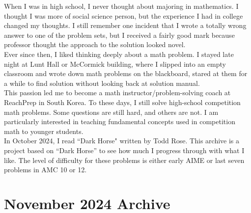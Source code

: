 \documentclass[12pt]{article}
\begin{document}
\begin{flushleft}
When I was in high school, I never thought about majoring in mathematics. I thought I was more of social science person, but the experience I had in college changed my thoughts. I still remember one incident that I wrote a totally wrong answer to one of the problem sets, but I received a fairly good mark because professor thought the approach to the solution looked novel.\\
\bigskip
Ever since then, I liked thinking deeply about a math problem. I stayed late night at Lunt Hall or McCormick building, where I slipped into an empty classroom and wrote down math problems on the blackboard, stared at them for a while to find solution without looking back at solution manual.\\
\bigskip
This passion led me to become a math instructor/problem-solving coach at ReachPrep in South Korea. To these days, I still solve high-school competition math problems. Some questions are still hard, and others are not. I am particularly interested in teaching fundamental concepts used in competition math to younger students.\\
\bigskip
In October 2024, I read ``Dark Horse" written by Todd Rose. This archive is a project based on ``Dark Horse'' to see how much I progress through with what I like. The level of difficulty for these problems is either early AIME or last seven problems in AMC 10 or 12.\\
\newpage


\section*{November 2024 Archive}




\end{flushleft}
\end{document}
